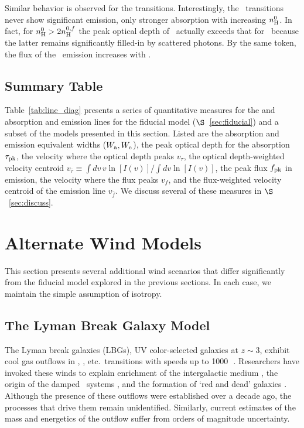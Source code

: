 \documentclass[12pt,preprint]{aastex}
\begin{document}
Similar behavior is observed for the  transitions.
Interestingly, the \feiia\ transitions never show significant emission,
only stronger absorption with increasing $n_{\rm H}^0$.  In fact, for $n_{\rm H}^0
> 2 n_{\rm H}^{0,f}$ the peak optical depth of \feiia\ actually exceeds that
for \feiib\ because the latter remains significantly filled-in by
scattered photons.  By the same token, the flux of the \feiic\
emission increases with \nhn.

\subsection{Summary Table}

Table~\ref{tab:line_diag} presents a series of quantitative measures
for the \ion{Mg}{2} and \ion{Fe}{2} absorption and emission lines for
the fiducial model ($\S$~\ref{sec:fiducial}) and a subset of the models
presented in this section.  Listed are the absorption and emission
equivalent widths ($W_{\rm a}, W_{\rm e}$), the peak optical depth
for the absorption $\tau_{\rm pk}$, the
velocity where the optical depth peaks $v_\tau$, the optical
depth-weighted velocity centroid $v_{\bar \tau} \equiv \int dv \, v
\ln[I(v)] / \int dv \ln[I(v)]$, the peak flux $f_{\rm pk}$ in
emission, the velocity where the flux peaks $v_f$, and the
flux-weighted velocity centroid of the emission line $v_{\bar f}$.
We discuss several of these measures in $\S$~\ref{sec:discuss}.


\section{Alternate Wind Models}
\label{sec:alternate}

This section presents several additional wind scenarios that differ
significantly from the fiducial model explored in the previous
sections.  In each case, we maintain the simple assumption of
isotropy.

\subsection{The Lyman Break Galaxy Model}
\label{sec:lbg}

The Lyman break galaxies (LBGs), UV color-selected galaxies at $z \sim 3$,
exhibit cool gas outflows in \ion{Si}{2}, \ion{C}{2},
etc.\ transitions with speeds up to 1000\,\kms\
\citep[e.g.][]{lkg+97,pks+98}.
Researchers have invoked these winds to explain enrichment of
the intergalactic medium \citep[e.g.][]{ahs+01,spa+06}, the origin of the
damped \lya\ systems \citep{nbf98,schaye01a}, and the formation of
`red and dead' galaxies \citep[e.g.][]{redgal}.  Although the
presence of these outflows were established over a decade ago,
the processes that drive them remain
unidentified.  Similarly,  current estimates of the mass and energetics of the
outflow suffer from orders of magnitude uncertainty.
\end{document}
